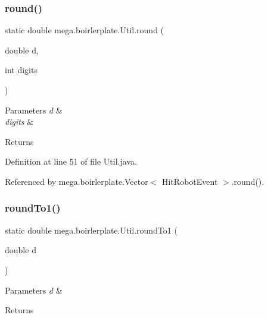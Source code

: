 \subsubsection{\texorpdfstring{round()}{round()}}
{\footnotesize\ttfamily static double mega.\+boirlerplate.\+Util.\+round (\begin{DoxyParamCaption}\item[{double}]{d,  }\item[{int}]{digits }\end{DoxyParamCaption})\hspace{0.3cm}{\ttfamily [static]}}


\begin{DoxyParams}{Parameters}
{\em d} & \\
\hline
{\em digits} & \\
\hline
\end{DoxyParams}
\begin{DoxyReturn}{Returns}

\end{DoxyReturn}


Definition at line 51 of file Util.\+java.



Referenced by mega.\+boirlerplate.\+Vector$<$ Hit\+Robot\+Event $>$.\+round().

\mbox{\label{classmega_1_1boirlerplate_1_1_util_af268ebc7c028bce1824d7ba883c0af7c}} 
\subsubsection{\texorpdfstring{round\+To1()}{roundTo1()}}
{\footnotesize\ttfamily static double mega.\+boirlerplate.\+Util.\+round\+To1 (\begin{DoxyParamCaption}\item[{double}]{d }\end{DoxyParamCaption})\hspace{0.3cm}{\ttfamily [static]}}


\begin{DoxyParams}{Parameters}
{\em d} & \\
\hline
\end{DoxyParams}
\begin{DoxyReturn}{Returns}

\end{DoxyReturn}


